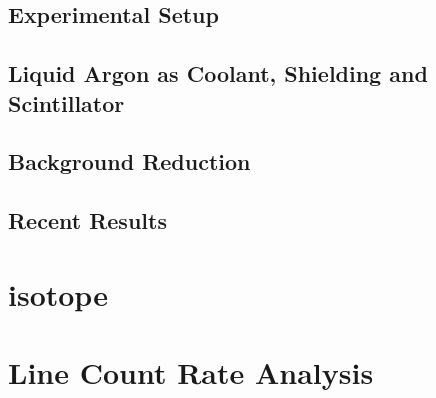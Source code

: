 \section{Experimental Setup}
\label{sec:ExSetup}


\section{Liquid Argon as Coolant, Shielding and Scintillator} 
\label{sec:LArcoolant}


\section{Background Reduction}
\label{sec:BGReduction}



\section{Recent Results}
\label{sec:ResultsofGERDA}




\chapter{\Kr isotope}
\label{sec:Kry85}


 
\chapter{Line Count Rate Analysis}
\label{sec:SAfrom514}


